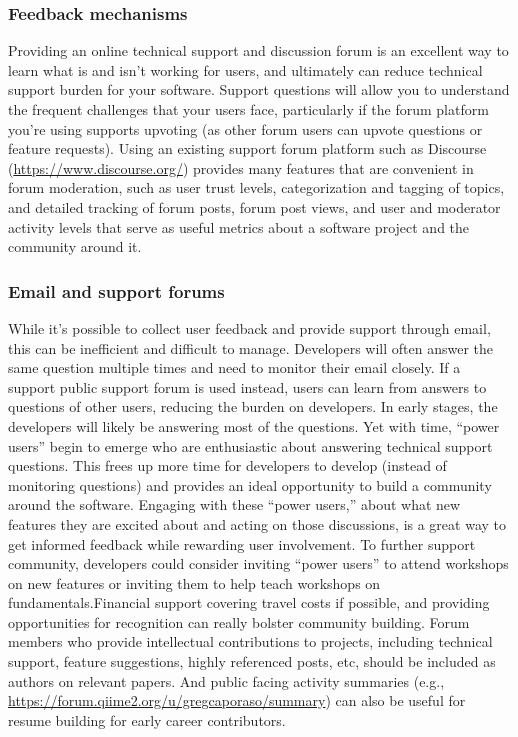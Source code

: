 \documentclass{article}
\begin{document}
\subsubsection{Feedback mechanisms}
Providing an online technical support and discussion forum is an excellent way to learn what is and isn’t working for users, and ultimately can reduce technical support burden for your software. Support questions will allow you to understand the frequent challenges that your users face, particularly if the forum platform you're using supports upvoting (as other forum users can upvote questions or feature requests). Using an existing support forum platform such as Discourse (\url{https://www.discourse.org/}) provides many features that are convenient in forum moderation, such as user trust levels, categorization and tagging of topics, and detailed tracking of forum posts, forum post views, and user and moderator activity levels that serve as useful metrics about a software project and the community around it. 
\subsubsection{Email and support forums}
While it’s possible to collect user feedback and provide support through email, this can be inefficient and difficult to manage. Developers will often answer the same question multiple times and need to monitor their email closely. If a support public support forum is used instead, users can learn from answers to questions of other users, reducing the burden on developers. In early stages, the developers will likely be answering most of the questions. Yet with time, “power users” begin to emerge who are enthusiastic about answering technical support questions. This frees up more time for developers to develop (instead of monitoring questions) and provides an ideal opportunity to build a community around the software. Engaging with these “power users,” about what new features they are excited about and acting on those discussions, is a great way to get informed feedback while rewarding user involvement. To further support community, developers could consider inviting “power users” to attend workshops on new features or inviting them to help teach workshops on fundamentals.Financial support covering travel costs if possible, and providing opportunities for recognition can really bolster community building. Forum members who provide intellectual contributions to projects, including technical support, feature suggestions, highly referenced posts, etc, should be included as authors on relevant papers. And public facing activity summaries (e.g., \url{https://forum.qiime2.org/u/gregcaporaso/summary}) can also be useful for resume building for early career contributors.
\end{document}
